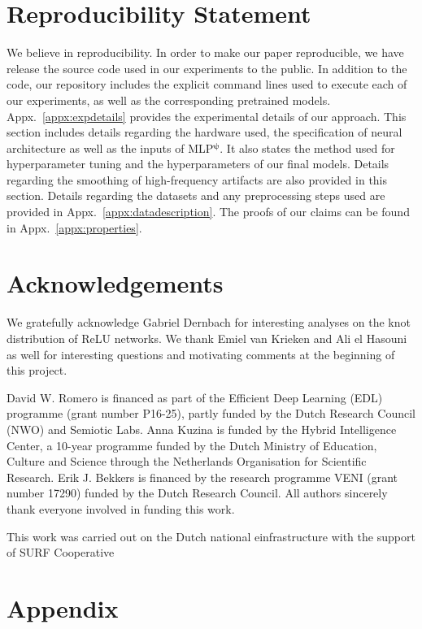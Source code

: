 \documentclass{article}
\def\bpsi{{\boldsymbol{\psi}}}
\newcommand{\mlp}{{\btt MLP}}
\newcommand{\mlppsi}{\mlp$^{\bpsi}$}
\begin{document}
\section*{Reproducibility Statement}
We believe in reproducibility. In order to make our paper reproducible, we have release the source code used in our experiments to the public. In addition to the code, our repository includes the explicit command lines used to execute each of our experiments, as well as the corresponding pretrained models. Appx.~\ref{appx:expdetails} provides the experimental details of our approach. This section includes details regarding the hardware used, the specification of neural architecture as well as the inputs of \mlppsi. It also states the method used for hyperparameter tuning and the hyperparameters of our final models. Details regarding the smoothing of high-frequency artifacts are also provided in this section. Details regarding the datasets and any preprocessing steps used are provided in Appx.~\ref{appx:datadescription}. The proofs of our claims can be found in Appx.~\ref{appx:properties}.

\section*{Acknowledgements}
We gratefully acknowledge Gabriel Dernbach for interesting analyses on the knot distribution of ReLU networks.
We thank Emiel van Krieken and Ali el Hasouni as well
for interesting questions and motivating comments at the
beginning of this project.

David W. Romero is financed as part of the Efficient Deep
Learning (EDL) programme (grant number P16-25), partly
funded by the Dutch Research Council (NWO) and Semiotic
Labs. Anna Kuzina is funded by the Hybrid Intelligence
Center, a 10-year programme funded by the Dutch Ministry
of Education, Culture and Science through the Netherlands
Organisation for Scientific Research. Erik J. Bekkers is
financed by the research programme VENI (grant number
17290) funded by the Dutch Research Council. All authors
sincerely thank everyone involved in funding this work.

This work was carried out on the Dutch national einfrastructure with the support of SURF Cooperative




\newpage
\appendix

\section*{{\LARGE Appendix}} \vspace{2mm}
\end{document}
